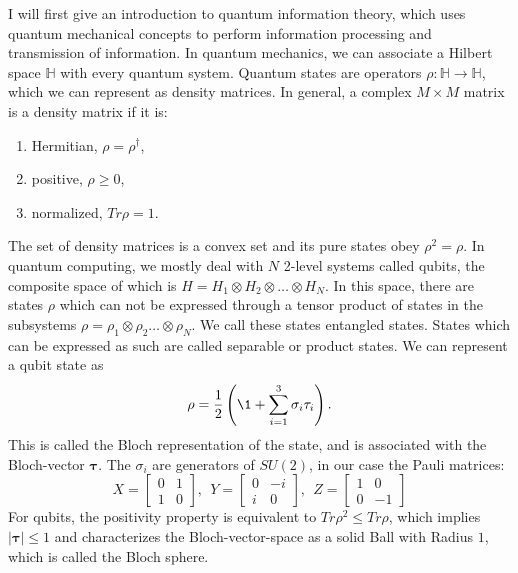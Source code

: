 I will first give an introduction to quantum information theory, which uses quantum mechanical concepts to perform information processing and transmission of information.
In quantum mechanics, we can associate a Hilbert space $\mathbb{H}$ with every quantum system.
Quantum states are operators $\rho :\mathbb{H}\to\mathbb{H}$, which we can represent as density matrices.
In general, a complex $M \times M$ matrix is a density matrix if it is:
\begin{center}\begin{enumerate}
	\item Hermitian,	$\rho =\rho^{\dagger}$,
	\item positive,		$\rho \ge 0$,
	\item normalized, 	$Tr\rho = 1$.
\end{enumerate}\end{center}
The set of density matrices is a convex set and its pure states obey $\rho^2 = \rho$.
In quantum computing, we mostly deal with $N$ 2-level systems called qubits, the composite space of which is $H = H_1 \otimes H_2 \otimes \ldots \otimes H_N$.
In this space, there are states $\rho$ which can not be expressed through a tensor product of states in the subsystems $\rho = \rho_1\otimes\rho_2\ldots\otimes\rho_N$.
We call these states entangled states.
States which can be expressed as such are called separable or product states.
We can represent a qubit state as \[
	\rho= \frac{1}{2}\left( \1 + \sum_{i=1}^{3} \sigma_i\tau_i \right)
.\]
This is called the Bloch representation of the state, and is associated with the Bloch-vector $\bm{\tau}$.
The $\sigma_i$ are generators of $SU\left( 2 \right) $, in our case the Pauli matrices:
$$
 X = \begin{bmatrix} 0 & 1 \\
                    1 & 0
        \end{bmatrix},~
	~Y = \begin{bmatrix} 0 & -i \\
                    i & 0
         \end{bmatrix},~
    ~Z = \begin{bmatrix} 1 & 0 \\
                    0 & -1
        \end{bmatrix}
$$
For qubits, the positivity property is equivalent to $Tr\rho^2\le Tr\rho$, which implies $|\bm{\tau}|\le 1$ and characterizes the Bloch-vector-space as a solid Ball with Radius $1$, which is called the Bloch sphere.\\
